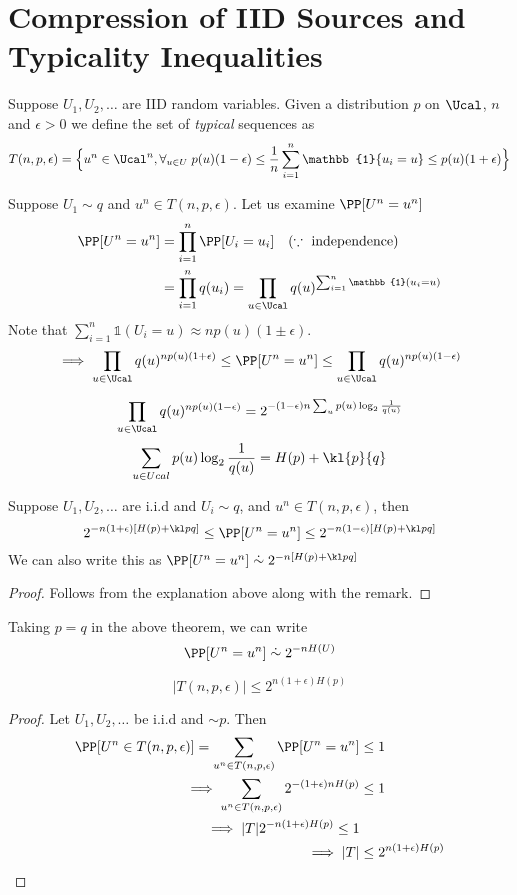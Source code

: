 \section{Compression of IID Sources and Typicality Inequalities}
\begin{definition}
Suppose $U_1, U_2, \dots$ are IID random variables. Given a distribution $p$ on $\Ucal$, $n$ and $\epsilon > 0$ we define the set of \textit{typical} sequences as
\[ T(n,p,\epsilon) = \Big\{ u^n \in \Ucal^n, \forall_{u\in U}\; p(u)(1-\epsilon) \leq \frac{1}{n} \sum_{i=1}^n \mathbb{1}\{u_i = u\} \leq p(u)(1+\epsilon)\Big\}\]
\end{definition}
Suppose $U_1 \sim q$ and $u^n \in T(n,p,\epsilon)$. Let us examine $\PP[U^n = u^n]$
\begin{align*}
\PP[U^n = u^n] &= \prod_{i=1}^n \PP[U_i=u_i] \quad (\because \text{ independence}) \\
&= \prod_{i=1}^n q(u_i) = \prod_{u \in \Ucal} q(u) ^{\sum_{i=1}^n \mathbb{1} (u_i = u)}
\end{align*}
Note that $\sum_{i=1}^n \mathbb{1}(U_i = u) \approx n p(u) (1 \pm \epsilon)$.
\[ \implies \prod_{u \in \Ucal} q(u) ^{np(u)(1+\epsilon)} \leq \PP[U^n = u^n] \leq \prod_{u \in \Ucal} q(u) ^{np(u)(1-\epsilon)}\]
\begin{remark}
\[\prod_{u \in \Ucal} q(u)^{np(u)(1-\epsilon)} = 2^{-(1-\epsilon)n \sum_u p(u)\log_2\frac{1}{q(u)}} \]
\[\sum_{u \in Ucal} p(u) \log_2 \frac{1}{q(u)} = H(p) + \kl{p}{q}\]
\end{remark}
\begin{theorem}
Suppose $U_1, U_2, \dots$ are i.i.d and $U_i \sim q$, and $u^n \in T(n,p,\epsilon)$, then
\[2^{-n(1+\epsilon)[H(p) + \kl pq]} \leq \PP[U^n = u^n] \leq 2^{-n(1-\epsilon)[H(p) + \kl pq]} \]
We can also write this as $\PP[U^n = u^n] \mathrel{\dot\sim} 2^{-n[H(p) + \kl pq]}$
\end{theorem}
\begin{proof}
Follows from the explanation above along with the remark.
\end{proof}
\begin{corollary}
Taking $p = q$ in the above theorem, we can write
\[\PP[U^n = u^n] \mathrel{\dot\sim} 2^{-n H(U)} \]
\end{corollary}
\begin{theorem}
\[|T(n,p,\epsilon)| \leq 2^{n(1+\epsilon)H(p)}\]
\end{theorem}
\begin{proof}
Let $U_1, U_2, \dots$ be i.i.d and $\sim p$. Then
\begin{align*}
    \PP[U^n \in T(n,p,\epsilon)] = \sum_{u^n \in T(n,p,\epsilon)} \PP[U^n = u^n] &\leq 1 \\
    \implies \sum_{u^n \in T(n,p,\epsilon)} 2^{-(1+\epsilon) n H(p)} &\leq 1 \\
    \implies |T| 2^{-n(1+\epsilon) H(p)} \leq 1 \\
    \implies |T| &\leq 2^{n(1+\epsilon)H(p)}
\end{align*}
\end{proof}
